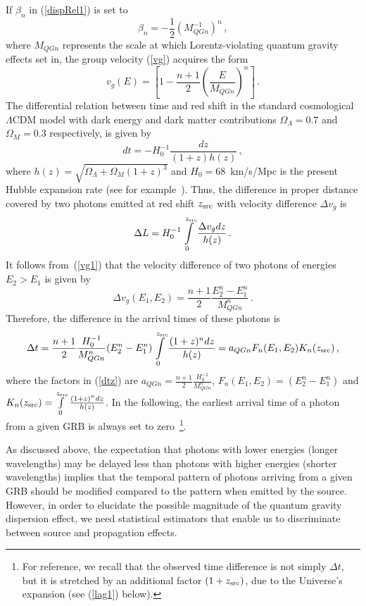 \documentclass[12pt]{article}
\newcommand{\beq}{\begin{equation}}
\newcommand{\eeq}{\end{equation}}
\begin{document}
If $\beta_n$ in (\ref{dispRel1}) is set to
\beq
\label{betanQG}
\beta_n=-\frac{1}{2}(M_{QGn}^{-1})^n \, ,
\eeq
where $M_{QGn}$ represents the scale at which Lorentz-violating quantum gravity effects set in,
the group velocity (\ref{vg}) acquires the form
\beq
\label{vg1}
v_g(E)=\left[ 1-\frac{n+1}{2}\left( \frac{E}{M_{QGn}}\right)^n\right] \, .
\eeq
The differential relation between time and red shift in the standard cosmological
$\Lambda$CDM model with dark energy and dark matter contributions $\Omega_{\Lambda} = 0.7$ and  $\Omega_M = 0.3$
respectively, is given by
\beq
\label{tz}
dt=-H_0^{-1}\frac{dz}{(1+z)h(z)} \, ,
\eeq
where $h(z)=\sqrt{\Omega_{\Lambda}+\Omega_M(1+z)^3}$ and $H_0=68$~km/s/Mpc is the present Hubble expansion rate (see for example~\cite{PDG}).
Thus, the difference in {proper} distance covered by two photons emitted  at red shift $z_{\rm src}$ with velocity difference $\Delta v_g$ is
\beq
\label{distz1}
\Delta L = H_0^{-1}\int\limits_{0}^{z_{\rm src}}\frac{\Delta v_g dz}{h(z)} \, .
\eeq
It follows from~(\ref{vg1}) that the velocity difference of two photons of energies $E_2>E_1$ is given by
\beq
\label{dvg}
\Delta v_g(E_1,E_2) = \frac{n+1}{2}\frac{E_2^n-E_1^n}{M_{QGn}^n} \, .
\eeq
Therefore, the difference in the arrival times of these photons is
\beq
\label{dtz}
\Delta t=\frac{n+1}{2}\frac{H_0^{-1}}{M_{QGn}^n}(E_2^n-E_1^n)\int\limits_0^{z_{\rm src}}\frac{(1+z)^ndz}{h(z)} =
a_{QGn}F_n(E_1,E_2)K_n(z_{\rm src}) \, ,
\eeq
{where the factors in (\ref{dtz}) are $a_{QGn}=\frac{n+1}{2}\frac{H_0^{-1}}{M_{QGn}^n}$, $F_n(E_1,E_2)=(E_2^n-E_1^n)$ and
$K_n(z_{\rm src})=\int\limits_0^{z_{\rm src}}\frac{(1+z)^ndz}{h(z)}$}.
In the following, the earliest arrival time  of a photon from a given GRB is always set to zero~\footnote{For reference, we
recall that the observed time difference is not simply $\Delta t $, but it is stretched by an additional factor $(1 + z_{\rm src})$,
due to the Universe's expansion (see (\ref{lag1}) below).}.

As discussed above, the expectation that photons with lower energies (longer wavelengths)
may be delayed less than photons with higher energies (shorter wavelengths)
implies that the temporal pattern of photons arriving from a given GRB
should be modified compared to the pattern when emitted by the source.
However, in order to elucidate the possible magnitude of the quantum gravity dispersion effect, we need
statistical estimators that enable us to discriminate between source and propagation effects.
\end{document}
